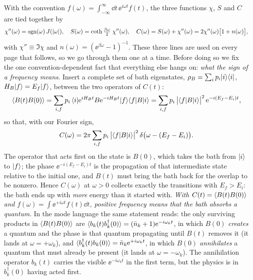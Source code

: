With the convention $f(\omega)=\int_{-\infty}^\infty\dd t\,\ee^{i\omega t}f(t)$, the three functions $\chi$, $S$ and $C$ are tied together by
\begin{equation}
  \chi''(\omega)=\operatorname{sgn}(\omega)\,J(|\omega|),\quad
  S(\omega)=\coth\tfrac{\beta\omega}{2}\;\chi''(\omega),\quad
  C(\omega)=S(\omega)+\chi''(\omega)=2\chi''(\omega)\big[1+n(\omega)\big],
  \label{eq:FDT}
\end{equation}
with $\chi''\equiv\Im\chi$ and $n(\omega)=(\ee^{\beta\omega}-1)^{-1}$.
These three lines are used on every page that follows, so we go through them one at a time.
Before doing so we fix the one convention-dependent fact that everything else hangs on: \emph{what the sign of a frequency means}.
Insert a complete set of bath eigenstates, $\rho_{B}=\sum_ip_i|i\rangle\langle i|$, $H_B|f\rangle=E_f|f\rangle$, between the two operators of $C(t)$:
\begin{equation}
  \langle B(t)B(0)\rangle=\sum_{i,f}p_i\,\langle i|\mathrm{e}^{iH_Bt}B\mathrm{e}^{-iH_Bt}|f\rangle\langle f|B|i\rangle
  =\sum_{i,f}p_i\,\big|\langle f|B|i\rangle\big|^2\,\mathrm{e}^{-i(E_f-E_i)t},
\end{equation}
so that, with our Fourier sign,
\begin{equation}
  C(\omega)=2\pi\sum_{i,f}p_i\,\big|\langle f|B|i\rangle\big|^2\,\delta\big(\omega-(E_f-E_i)\big).
  \label{eq:C-golden}
\end{equation}
The operator that acts first on the state is $B(0)$, which takes the bath from $|i\rangle$ to $|f\rangle$; the phase $\ee^{-i(E_f-E_i)t}$ is the propagation of that intermediate state relative to the initial one, and $B(t)$ must bring the bath back for the overlap to be nonzero.
Hence $C(\omega)$ at $\omega>0$ collects exactly the transitions with $E_f>E_i$: the bath ends up with \emph{more} energy than it started with.
\emph{With $C(t)=\langle B(t)B(0)\rangle$ and $f(\omega)=\int\ee^{+i\omega t}f(t)\dd t$, positive frequency means that the bath absorbs a quantum.}
In the mode language the same statement reads: the only surviving products in $\langle B(t)B(0)\rangle$ are $\langle b_k(t)b_k^\dagger(0)\rangle=(\bar n_k+1)\mathrm{e}^{-i\omega_kt}$, in which $B(0)$ \emph{creates} a quantum and the phase is that quantum propagating until $B(t)$ removes it (it lands at $\omega=+\omega_k$), and $\langle b_k^\dagger(t)b_k(0)\rangle=\bar n_k\mathrm{e}^{+i\omega_kt}$, in which $B(0)$ \emph{annihilates} a quantum that must already be present (it lands at $\omega=-\omega_k$).
The annihilation operator $b_k(t)$ carries the visible $\ee^{-i\omega_kt}$ in the first term, but the physics is in $b_k^\dagger(0)$ having acted first.

